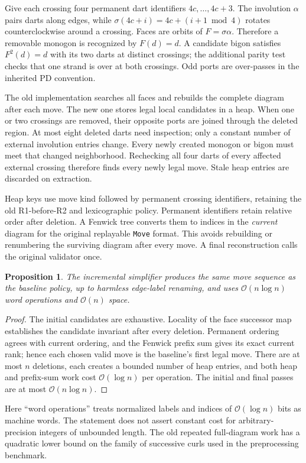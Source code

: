\documentclass[11pt]{article}
\newtheorem{proposition}[theorem]{Proposition}
\theoremstyle{remark}\newtheorem{remark}[theorem]{Remark}
\newcommand{\OO}{\mathcal O}
\newcommand{\code}[1]{\texttt{\small #1}}
\begin{document}
Give each crossing four permanent dart identifiers $4c,\ldots,4c+3$.
The involution $\alpha$ pairs darts along edges, while
$\sigma(4c+i)=4c+(i+1\bmod4)$ rotates counterclockwise around a crossing.
Faces are orbits of $F=\sigma\alpha$. Therefore a removable monogon is
recognized by $F(d)=d$. A candidate bigon satisfies $F^2(d)=d$ with its
two darts at distinct crossings; the additional parity test checks that
one strand is over at both crossings. Odd ports are over-passes in the
inherited PD convention.

The old implementation searches all faces and rebuilds the complete diagram
after each move. The new one stores legal local candidates in a heap. When
one or two crossings are removed, their opposite ports are joined through
the deleted region. At most eight deleted darts need inspection; only a
constant number of external involution entries change. Every newly created
monogon or bigon must meet that changed neighborhood. Rechecking all four
darts of every affected external crossing therefore finds every newly legal
move. Stale heap entries are discarded on extraction.

Heap keys use move kind followed by permanent crossing identifiers, retaining
the old R1-before-R2 and lexicographic policy. Permanent identifiers retain
relative order after deletion. A Fenwick tree converts them to indices in
the \emph{current} diagram for the original replayable \code{Move} format.
This avoids rebuilding or renumbering the surviving diagram after every
move. A final reconstruction calls the original validator once.

\begin{proposition}
The incremental simplifier produces the same move sequence as the baseline
policy, up to harmless edge-label renaming, and uses $\OO(n\log n)$ word
operations and $\OO(n)$ space.
\end{proposition}
\begin{proof}
The initial candidates are exhaustive. Locality of the face successor map
establishes the candidate invariant after every deletion. Permanent ordering
agrees with current ordering, and the Fenwick prefix sum gives its exact
current rank; hence each chosen valid move is the baseline's first legal
move. There are at most $n$ deletions, each creates a bounded number of
heap entries, and both heap and prefix-sum work cost $\OO(\log n)$ per
operation. The initial and final passes are at most $\OO(n\log n)$.
\end{proof}

Here ``word operations'' treats normalized labels and indices of
$\OO(\log n)$ bits as machine words. The statement does not assert constant
cost for arbitrary-precision integers of unbounded length. The old repeated
full-diagram work has a quadratic lower bound on the family of successive
curls used in the preprocessing benchmark.
\end{document}

